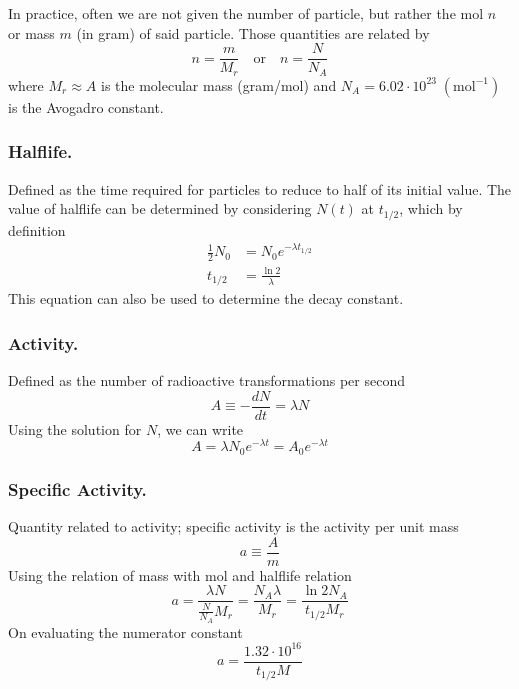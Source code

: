 \documentclass[../../../main.tex]{subfiles}
\begin{document}
In practice, often we are not given the number of particle, but rather the mol $n$ or mass $m$ (in gram) of said particle. Those quantities are related by 
\begin{equation*}
    n=\frac{m}{M_r}\quad \text{or}\quad n=\frac{N}{N_A}
\end{equation*}
where $M_r\approx A$ is the molecular mass (gram/mol) and $N_A=6.02\cdot 10^{23}\;(\text{mol}^{-1})$ is the Avogadro constant.

\subsubsection{Halflife.} Defined as the time required for particles to reduce to half of its initial value. The value of halflife can be determined by considering $N(t)$ at $t_{1/2}$, which by definition
\begin{align*}
    \frac{1}{2}N_0&=N_0e^{-\lambda t_{1/2}}\\
    t_{1/2}&=\frac{\ln 2}{\lambda}
\end{align*}
This equation can also be used to determine the decay constant.

\subsubsection{Activity.} Defined as the number of radioactive transformations per second
\begin{equation*}
    A\equiv-\frac{dN}{dt}=\lambda N
\end{equation*}
Using the solution for $N$, we can write
\begin{equation*}
    A=\lambda N_0 e^{-\lambda t}=A_0e^{-\lambda t}
\end{equation*}

\subsubsection{Specific Activity.} Quantity related to activity; specific activity is the activity per unit mass
\begin{equation*}
    a\equiv\frac{A}{m}
\end{equation*}
Using the relation of mass with mol and halflife relation
\begin{equation*}
    a=\frac{\lambda N}{\frac{N}{N_A}M_r}=\frac{N_A \lambda }{M_r}=\frac{\ln 2 N_A}{t_{1/2}M_r}
\end{equation*}
On evaluating the numerator constant
\begin{equation*}
    a=\frac{1.32\cdot 10^{16}}{t_{1/2}M}
\end{equation*}
\end{document}
